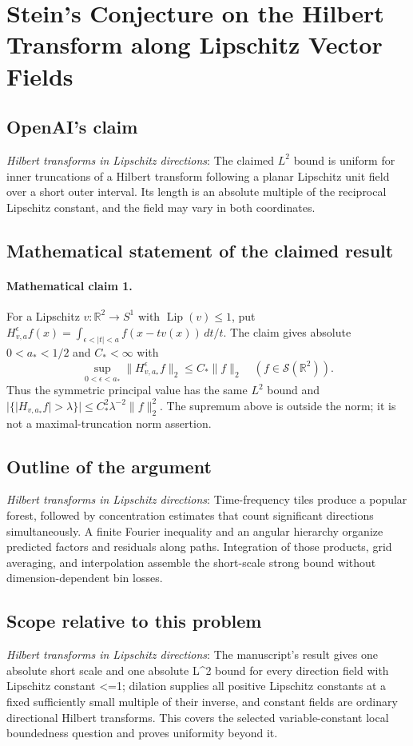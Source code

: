 \documentclass[11pt]{article}
\begin{document}
\section*{Stein's Conjecture on the Hilbert Transform along Lipschitz Vector Fields}

\subsection{OpenAI's claim}
\textit{Hilbert transforms in Lipschitz directions}: The claimed $L^2$ bound is uniform for inner truncations of a Hilbert transform following a planar Lipschitz unit field over a short outer interval. Its length is an absolute multiple of the reciprocal Lipschitz constant, and the field may vary in both coordinates.

\subsection{Mathematical statement of the claimed result}
\paragraph{Mathematical claim 1.} For a Lipschitz $v:\mathbb R^2\to S^1$ with $\operatorname{Lip}(v)\le1$, put $H_{v,a}^{\epsilon}f(x)=\int_{\epsilon<|t|<a}f(x-tv(x))\,dt/t$. The claim gives absolute $0<a_*<1/2$ and $C_*<\infty$ with \[\sup_{0<\epsilon<a_*}\|H_{v,a_*}^{\epsilon}f\|_2\le C_*\|f\|_2\quad(f\in\mathcal S(\mathbb R^2)).\] Thus the symmetric principal value has the same $L^2$ bound and $|\{|H_{v,a_*}f|>\lambda\}|\le C_*^2\lambda^{-2}\|f\|_2^2$. The supremum above is outside the norm; it is not a maximal-truncation norm assertion.

\subsection{Outline of the argument}
\textit{Hilbert transforms in Lipschitz directions}: Time-frequency tiles produce a popular forest, followed by concentration estimates that count significant directions simultaneously. A finite Fourier inequality and an angular hierarchy organize predicted factors and residuals along paths. Integration of those products, grid averaging, and interpolation assemble the short-scale strong bound without dimension-dependent bin losses.

\subsection{Scope relative to this problem}
\textit{Hilbert transforms in Lipschitz directions}: The manuscript’s result gives one absolute short scale and one absolute L\textasciicircum{}2 bound for every direction field with Lipschitz constant <=1; dilation supplies all positive Lipschitz constants at a fixed sufficiently small multiple of their inverse, and constant fields are ordinary directional Hilbert transforms. This covers the selected variable-constant local boundedness question and proves uniformity beyond it.
\end{document}
